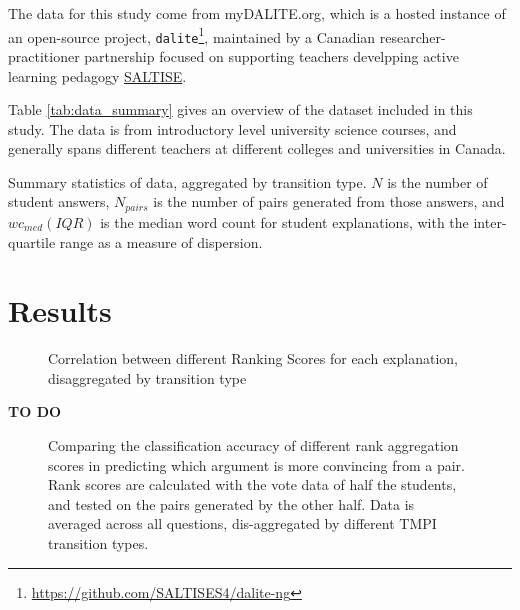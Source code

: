 \documentclass[sigconf]{acmart}
\begin{document}
The data for this study come from myDALITE.org, which is a hosted instance of 
an open-source project, 
\verb|dalite|\footnote{\url{https://github.com/SALTISES4/dalite-ng}}, 
maintained by a Canadian researcher-practitioner partnership focused on 
supporting teachers develpping active learning pedagogy 
\href{saltise.ca}{SALTISE}.

Table \ref{tab:data_summary} gives an overview of the dataset included in this 
study.
The data is from introductory level university science courses, and generally 
spans different teachers at different colleges and universities in Canada. 
 
\begin{table}
	
	\caption{
		Summary statistics of data, aggregated by transition type. 
		$N$ is the number of student answers, $N_{pairs}$ is the number of 
		pairs generated from those answers, and $wc_{med} (IQR)$ is the median 
		word 
		count 
		for student explanations, with the inter-quartile range as a measure of 
		dispersion. 
	}
	\label{tab:data_summary}
\end{table}

\section{Results}

\begin{figure}
	\scalebox{0.6}{}
	\caption{
		Correlation between different Ranking Scores for each explanation, 
		disaggregated by transition type  
	}
	\label{fig:acc_by_rank_score_type}
\end{figure}

\textbf{TO DO}



\begin{figure}
	\scalebox{0.3}{}
	\caption{
		Comparing the classification accuracy of different rank aggregation 
		scores in predicting which argument is more convincing from a pair. 
		Rank scores are calculated with the vote data of half the students, and 
		tested on the pairs generated by the other half. 
		Data is averaged across all questions, dis-aggregated by different TMPI 
		transition types. 
	}
	\label{fig:acc_by_rank_score_type}
\end{figure}
\end{document}
